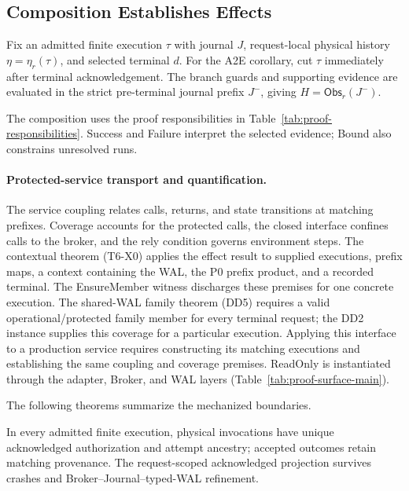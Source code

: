 \documentclass[acmsmall,screen,review,anonymous]{acmart}
\begin{document}
\subsection{Composition Establishes Effects}

Fix an admitted finite execution $\tau$ with journal $J$, request-local
physical history $\eta=\eta_r(\tau)$, and selected terminal $d$. For the
A2E corollary, cut $\tau$ immediately after terminal acknowledgement.
The branch guards and supporting evidence are evaluated in the strict
pre-terminal journal prefix $J^{-}$, giving $H=\mathsf{Obs}_r(J^{-})$.

The composition uses the proof responsibilities in
Table~\ref{tab:proof-responsibilities}. Success and Failure interpret the
selected evidence; Bound also constrains unresolved runs.

\paragraph{Protected-service transport and quantification.}
The service coupling relates calls, returns, and state transitions
at matching prefixes. Coverage accounts for the protected calls, the closed
interface confines calls to the broker, and the rely condition governs
environment steps. The contextual theorem (T6-X0) applies the effect result to supplied
executions, prefix maps, a context containing the WAL, the P0 prefix product,
and a recorded terminal. The EnsureMember witness discharges
these premises for one concrete execution. The shared-WAL family theorem
(DD5) requires a valid operational/protected family member for every terminal
request; the DD2 instance supplies this coverage for a particular execution.
Applying this interface to a production service requires constructing its
matching executions and establishing the same coupling and coverage premises.
ReadOnly is instantiated through the adapter, Broker, and WAL layers
(Table~\ref{tab:proof-surface-main}).

The following theorems summarize the mechanized boundaries.

\begin{theorem}
\label{thm:history-preservation}
In every admitted finite execution, physical invocations have unique
acknowledged authorization and attempt ancestry; accepted outcomes
retain matching provenance. The request-scoped acknowledged projection
survives crashes and Broker--Journal--typed-WAL refinement.
\end{theorem}
\end{document}
